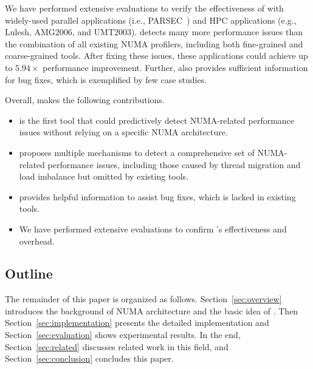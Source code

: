 We have performed extensive evaluations to verify the effectiveness of \NP{} with widely-used parallel applications (i.e., PARSEC~\cite{parsec}) and HPC applications (e.g., Lulesh, AMG2006, and UMT2003).  \NP{} detects many more performance issues than the combination of all existing NUMA profilers, including both fine-grained and coarse-grained tools. After fixing these issues, these applications could achieve up to $5.94\times$ performance improvement. Further, \NP{} also provides sufficient information for bug fixes, which is exemplified by few case studies. 

Overall, \NP{} makes the following contributions. 

\begin{itemize}
    \item \NP{} is the first tool that could predictively detect NUMA-related performance issues without relying on a specific NUMA architecture. 
    \item \NP{} proposes multiple mechanisms to detect a comprehensive set of NUMA-related performance issues, including those caused by thread migration and load imbalance but omitted by existing tools. 
    \item \NP{} provides helpful information to assist bug fixes, which is lacked in existing tools. 
    \item We have performed extensive evaluations to confirm \NP{}'s effectiveness and overhead.  
\end{itemize}


\subsection*{Outline}

The remainder of this paper is organized as follows. Section~\ref{sec:overview} introduces the background of NUMA architecture and the basic idea of \NP{}. Then Section~\ref{sec:implementation} presents the detailed implementation and Section~\ref{sec:evaluation} shows experimental results. In the end, Section~\ref{sec:related} discusses related work in this field, and Section~\ref{sec:conclusion} concludes this paper.

